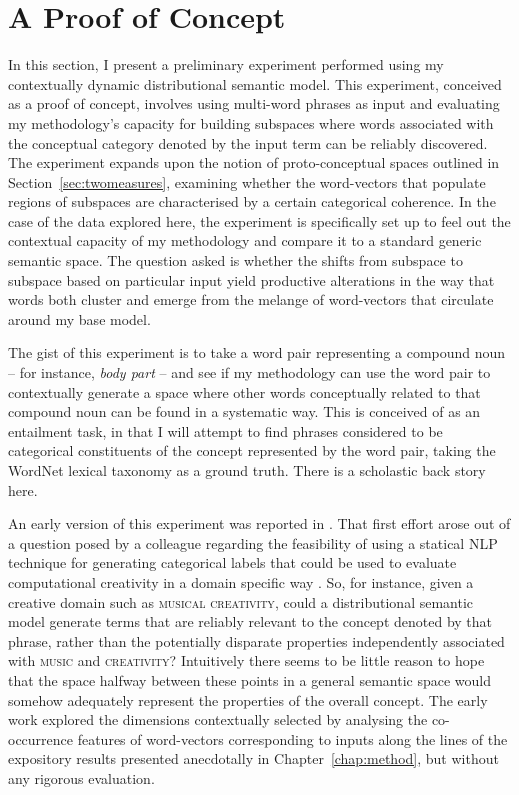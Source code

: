 \section{A Proof of Concept}\label{sec:poc}
In this section, I present a preliminary experiment performed using my contextually dynamic distributional semantic model.  This experiment, conceived as a proof of concept, involves using multi-word phrases as input and evaluating my methodology's capacity for building subspaces where words associated with the conceptual category denoted by the input term can be reliably discovered.  The experiment expands upon the notion of proto-conceptual spaces outlined in Section~\ref{sec:twomeasures}, examining whether the word-vectors that populate regions of subspaces are characterised by a certain categorical coherence.  In the case of the data explored here, the experiment is specifically set up to feel out the contextual capacity of my methodology and compare it to a standard generic semantic space.  The question asked is whether the shifts from subspace to subspace based on particular input yield productive alterations in the way that words both cluster and emerge from the melange of word-vectors that circulate around my base model.

The gist of this experiment is to take a word pair representing a compound noun -- for instance, \emph{body part} -- and see if my methodology can use the word pair to contextually generate a space where other words conceptually related to that compound noun can be found in a systematic way.  This is conceived of as an entailment task, in that I will attempt to find phrases considered to be categorical constituents of the concept represented by the word pair, taking the WordNet lexical taxonomy as a ground truth.  There is a scholastic back story here.

An early version of this experiment was reported in \cite{AgresEA2015}.  That first effort arose out of a question posed by a colleague regarding the feasibility of using a statical NLP technique for generating categorical labels that could be used to evaluate computational creativity in a domain specific way \citep[for a psychological perspective on the difficulty of generating such terms in an objective way using human subjects, see][]{VanDerVeldeEA2015}.  So, for instance, given a creative domain such as \textsc{musical creativity}, could a distributional semantic model generate terms that are reliably relevant to the concept denoted by that phrase, rather than the potentially disparate properties independently associated with \textsc{music} and \textsc{creativity}?  Intuitively there seems to be little reason to hope that the space halfway between these points in a general semantic space would somehow adequately represent the properties of the overall concept.  The early work explored the dimensions contextually selected by analysing the co-occurrence features of word-vectors corresponding to inputs along the lines of the expository results presented anecdotally in Chapter~\ref{chap:method}, but without any rigorous evaluation.


